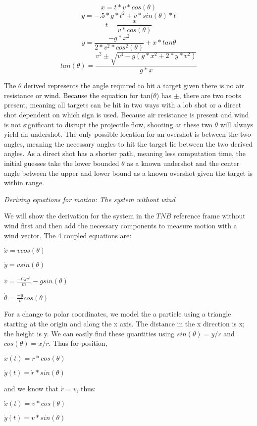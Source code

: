 \documentclass[12pt]{article}
\begin{document}
\begin{enumerate}
{\[x=t*v*cos(\theta)\]
\[y=-.5*g*t^2+v*sin(\theta)*t\]
\[t=\frac{x}{v*cos(\theta)}\]
\[y=\frac{-g*x^2}{2*v^2*cos^2(\theta)}+x*tan{\theta}\]
\[tan(\theta)=\frac{v^2\pm \sqrt{v^4 - g(g*x^2 + 2*y*v^2)}}{g*x}\]

The $\theta$ derived represents the angle required to hit a target given there is no air resistance or wind. Because the equation for tan($\theta$) has $\pm$, there are two roots present, meaning all targets can be hit in two ways with a lob shot or a direct shot dependent on which sign is used. Because air resistance is present and wind is not significant to disrupt the projectile flow, shooting at these two $\theta$ will always yield an undershot. The only possible location for an overshot is between the two angles, meaning the necessary angles to hit the target lie between the two derived angles. As a direct shot has a shorter path, meaning less computation time, the initial guesses take the lower bounded $\theta$ as a known undershot and the center angle between the upper and lower bound as a known overshot given the target is within range.}

\large{\item\textit{Deriving equations for motion: The system without wind}}

\normalsize{We will show the derivation for the system in the $TNB$ reference frame without wind first and then add the necessary components to measure motion with a wind vector.  The 4 coupled equations are:}

\centerline{$\dot{x} = vcos(\theta)$}
\centerline{$\dot{y} = vsin(\theta)$}
\centerline{$\dot{v} = \frac{-C_d v^2}{m} - gsin(\theta)$}
\centerline{$\dot{\theta} =\frac{-g}{v}cos(\theta)$}

For a change to polar coordinates, we model the a particle using a triangle starting at the origin and along the x axis.  The distance in the x direction is x; the height is y.  We can easily find these quantities using $sin(\theta) = y/r$ and $cos(\theta) = x/r$.  Thus for position, \\

\centerline{$\dot{x}(t) = \dot{r}*cos(\theta)$}

\centerline{$\dot{y}(t) = \dot{r}*sin(\theta)$}

\centerline{and we know that $\dot{r} = v$, thus:}

\centerline{$\dot{x}(t) = v*cos(\theta)$}

\centerline{$\dot{y}(t) = v*sin(\theta)$}



\end{enumerate}
\end{document}
